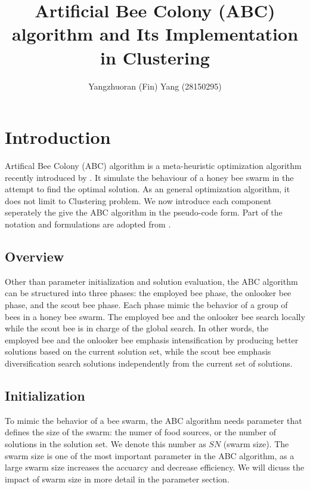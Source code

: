 \documentclass[]{article}
\title{Artificial Bee Colony (ABC) algorithm and Its Implementation in Clustering}
\author{Yangzhuoran (Fin) Yang (28150295)}
\date{}
\begin{document}
\maketitle

\hypertarget{introduction}{%
\section{Introduction}\label{introduction}}

Artifical Bee Colony (ABC) algorithm is a meta-heuristic optimization algorithm recently introduced by \textcite{Karaboga2005}. It simulate the behaviour of a honey bee swarm in the attempt to find the optimal solution. As an general optimization algorithm, it does not limit to Clustering problem. We now introduce each component seperately the give the ABC algorithm in the pseudo-code form. Part of the notation and formulations are adopted from \textcite{karaboga2011novel}.

\hypertarget{overview}{%
\subsection{Overview}\label{overview}}

Other than parameter initialization and solution evaluation, the ABC algorithm can be structured into three phases: the employed bee phase, the onlooker bee phase, and the scout bee phase. Each phase mimic the behavior of a group of bees in a honey bee swarm. The employed bee and the onlooker bee search locally while the scout bee is in charge of the global search. In other words, the employed bee and the onlooker bee emphasis intensification by producing better solutions based on the current solution set, while the scout bee emphasis diversification search solutions independently from the current set of solutions.

\hypertarget{initialization}{%
\subsection{Initialization}\label{initialization}}

To mimic the behavior of a bee swarm, the ABC algorithm needs parameter that defines the size of the swarm: the numer of food sources, or the number of solutions in the solution set. We denote this number as \(SN\) (swarm size). The swarm size is one of the most important parameter in the ABC algorithm, as a large swarm size increases the accuarcy and decrease efficiency. We will dicuss the impact of swarm size in more detail in the parameter section.
\end{document}
